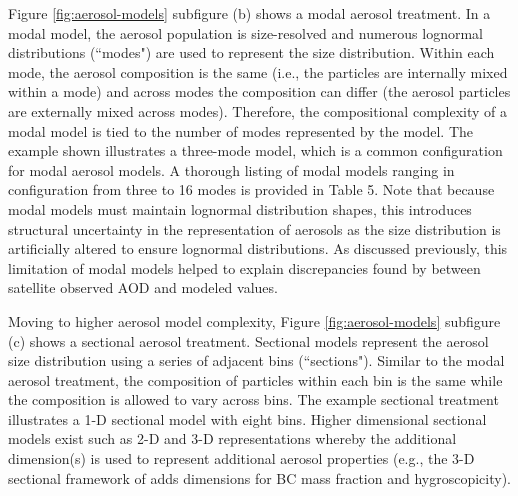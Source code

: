 Figure \ref{fig:aerosol-models} subfigure (b) shows a modal aerosol treatment. In a modal model, the aerosol population is size-resolved and numerous lognormal distributions (``modes") are used to represent the size distribution. Within each mode, the aerosol composition is the same (i.e., the particles are internally mixed within a mode) and across modes the composition can differ (the aerosol particles are externally mixed across modes). Therefore, the compositional complexity of a modal model is tied to the number of modes represented by the model. The example shown illustrates a three-mode model, which is a common configuration for modal aerosol models. A thorough listing of modal models ranging in configuration from three to 16 modes is provided in \cite{riemer_aerosol_2019} Table 5. Note that because modal models must maintain lognormal distribution shapes, this introduces structural uncertainty in the representation of aerosols as the size distribution is artificially altered to ensure lognormal distributions. As discussed previously, this limitation of modal models helped to explain discrepancies found by \cite{crippa_impact_2017} between satellite observed AOD and modeled values.  

Moving to higher aerosol model complexity, Figure \ref{fig:aerosol-models} subfigure (c) shows a sectional aerosol treatment. Sectional models represent the aerosol size distribution using a series of adjacent bins (``sections"). Similar to the modal aerosol treatment, the composition of particles within each bin is the same while the composition is allowed to vary across bins. The example sectional treatment illustrates a 1-D sectional model with eight bins. Higher dimensional sectional models exist such as 2-D and 3-D representations whereby the additional dimension(s) is used to represent additional aerosol properties (e.g., the 3-D sectional framework of \cite{ching_three-dimensional_2016} adds dimensions for BC mass fraction and hygroscopicity).

